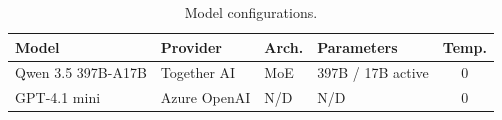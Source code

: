 


\begin{table}[htbp]
\centering
\caption{Model configurations.}
\label{tab:model-config}
\small
\begin{tabular}{@{}llllc@{}}
\toprule
Model & Provider & Arch. & Parameters & Temp. \\
\midrule
Qwen 3.5 397B-A17B & Together AI & MoE & 397B / 17B active & 0 \\
GPT-4.1 mini & Azure OpenAI & N/D & N/D & 0 \\
\bottomrule
\end{tabular}
\end{table}


